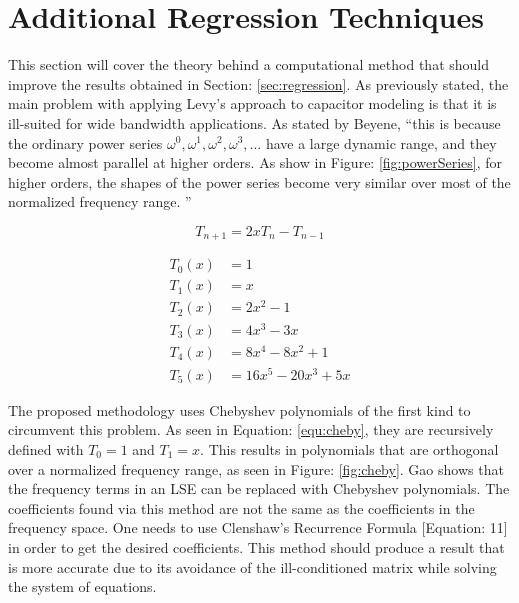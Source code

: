 \section{Additional Regression Techniques}
\label{app:adtl_regression}
\nocite{neu_ModelSynth}
\nocite{cuth_regression}
\nocite{bbc_chebyshev}



This section will cover the theory behind a computational method that should improve the results obtained in Section: \ref{sec:regression}. As previously stated, the main problem with applying Levy's approach to capacitor modeling is that it is ill-suited for wide bandwidth applications. As stated by Beyene, ``this is because the ordinary power series ${\omega ^0, \omega ^1, \omega ^2, \omega ^3,...}$ have a large dynamic range, and they become almost parallel at higher orders. As show in Figure: \ref{fig:powerSeries}, for higher orders, the shapes of the power series become very similar over most of the normalized frequency range. \cite{beyene_uwave}''

\begin{equation}
\label{equ:cheby}
T_{n+1} = 2xT_{n}-T_{n-1}
\end{equation}

\begin{equation}
    \label{equ:chebyPolys}
    \begin{split}
         T_0(x) &= 1           \\
         T_1(x) &= x           \\
         T_2(x) &= 2x^2-1      \\
         T_3(x) &= 4x^3-3x     \\
         T_4(x) &= 8x^4-8x^2+1 \\
         T_5(x) &= 16x^5-20x^3+5x
    \end{split}
\end{equation}

The proposed methodology uses Chebyshev polynomials of the first kind to circumvent this problem. As seen in Equation: \eqref{equ:cheby}, they are recursively defined with $T_0 = 1$ and $T_1 = x$. This results in polynomials that are orthogonal over a normalized frequency range, as seen in Figure: \ref{fig:cheby}. Gao\cite{gao_blackBox} shows that the frequency terms in an LSE can be replaced with Chebyshev polynomials. The coefficients found via this method are not the same as the coefficients in the frequency space. One needs to use Clenshaw's Recurrence Formula \cite{gao_blackBox}[Equation: 11] in order to get the desired coefficients. This method should produce a result that is more accurate due to its avoidance of the ill-conditioned matrix while solving the system of equations.



